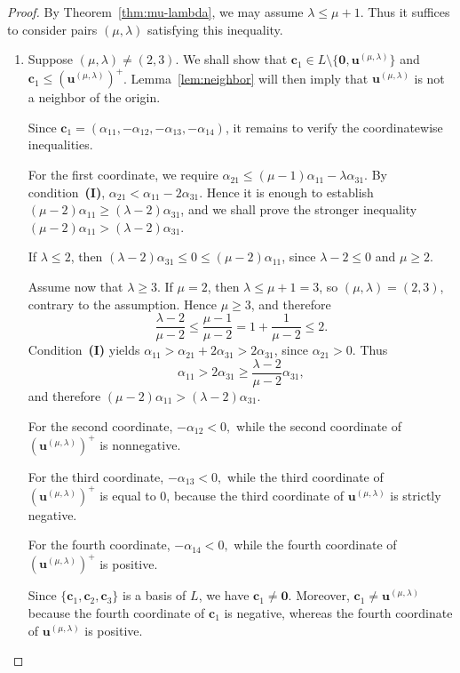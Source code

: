 \documentclass[12pt,a4paper]{amsart}
\theoremstyle{definition}
\begin{document}
\begin{proof}
By Theorem~\ref{thm:mu-lambda}, we may assume
$\lambda\le\mu+1$. Thus it suffices to consider pairs
$(\mu,\lambda)$ satisfying this inequality.

\begin{enumerate}

\item[\textbf{Case 1.}]
Suppose $(\mu,\lambda)\neq(2,3)$. We shall show that
$\mathbf c_1\in L\setminus\{\mathbf0,\mathbf u^{(\mu,\lambda)}\}$ and
$\mathbf c_1\le(\mathbf u^{(\mu,\lambda)})^+$.
Lemma~\ref{lem:neighbor} will then imply that
$\mathbf u^{(\mu,\lambda)}$ is not a neighbor of the origin.

Since
$\mathbf c_1=(\alpha_{11},-\alpha_{12},-\alpha_{13},-\alpha_{14})$,
it remains to verify the coordinatewise inequalities.

For the first coordinate, we require
$\alpha_{21}\le(\mu-1)\alpha_{11}-\lambda\alpha_{31}$.
By condition~\textup{\textbf{(I)}},
$\alpha_{21}<\alpha_{11}-2\alpha_{31}$.
Hence it is enough to establish
$(\mu-2)\alpha_{11}\ge(\lambda-2)\alpha_{31}$,
and we shall prove the stronger inequality
$(\mu-2)\alpha_{11}>(\lambda-2)\alpha_{31}$.

If $\lambda\le2$, then
$(\lambda-2)\alpha_{31}\le0\le(\mu-2)\alpha_{11}$,
since $\lambda-2\le0$ and $\mu\ge2$.

Assume now that $\lambda\ge3$. If $\mu=2$, then
$\lambda\le\mu+1=3$, so
$(\mu,\lambda)=(2,3)$, contrary to the assumption.
Hence $\mu\ge3$, and therefore
\[
\frac{\lambda-2}{\mu-2}
\le
\frac{\mu-1}{\mu-2}
=
1+\frac1{\mu-2}
\le2.
\]
Condition~\textup{\textbf{(I)}} yields
$\alpha_{11}>\alpha_{21}+2\alpha_{31}>2\alpha_{31}$,
since $\alpha_{21}>0$. Thus
\[\alpha_{11}>
2\alpha_{31}\ge
\frac{\lambda-2}{\mu-2}\alpha_{31},\]
and therefore
$(\mu-2)\alpha_{11}>(\lambda-2)\alpha_{31}$.

For the second coordinate,
$
-\alpha_{12}<0,$
while the second coordinate of $(\mathbf u^{(\mu,\lambda)})^+$ is
nonnegative.

For the third coordinate,
$
-\alpha_{13}<0,$ while the third coordinate of $(\mathbf u^{(\mu,\lambda)})^+$ is equal
to $0$, because the third coordinate of
$\mathbf u^{(\mu,\lambda)}$ is strictly negative.

For the fourth coordinate,
$
-\alpha_{14}<0,$
while the fourth coordinate of $(\mathbf u^{(\mu,\lambda)})^+$ is
positive.

Since
$\{\mathbf c_1,\mathbf c_2,\mathbf c_3\}$ is a basis of $L$,
we have
$\mathbf c_1\neq\mathbf0$.
Moreover,
$\mathbf c_1\neq\mathbf u^{(\mu,\lambda)}$
because the fourth coordinate of $\mathbf c_1$ is negative,
whereas the fourth coordinate of
$\mathbf u^{(\mu,\lambda)}$ is positive.


\end{enumerate}
\end{proof}
\end{document}
